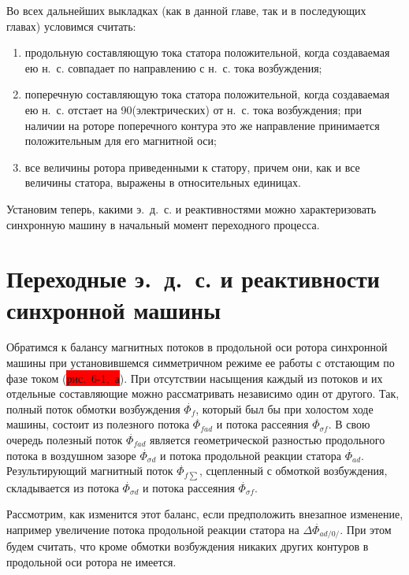 Во всех дальнейших выкладках (как в данной главе, так и в последующих главах) условимся считать:

\begin{enumerate} 
	\item
	продольную составляющую тока статора положительной, когда создаваемая ею н.~с. совпадает по направлению с н.~с. тока возбуждения;
	\item
	поперечную составляющую тока статора положительной, когда создаваемая ею н.~с. отстает на 90\textdegree (электрических) от н.~с. тока возбуждения; при наличии на роторе поперечного контура это же направление принимается положительным для его магнитной оси;
	\item
	все величины ротора приведенными к статору, причем они, как и все величины статора, выражены в относительных единицах.
\end{enumerate}

Установим теперь, какими э.~д.~с. и реактивностями можно характеризовать синхронную машину в начальный момент переходного процесса.

\section{Переходные э.~д.~с. и реактивности синхронной машины}
\label{sec:6-2}

Обратимся к балансу магнитных потоков в продольной оси ротора синхронной машины при установившемся симметричном режиме ее работы с отстающим по фазе током (\colorbox{red}{рис.~6-1,~а}). При отсутствии насыщения каждый из потоков и их отдельные составляющие можно рассматривать независимо один от другого. Так, полный поток обмотки возбуждения $ \overset{\;.}{\Phi}_f $, который был бы при холостом ходе машины, состоит из полезного потока $ \overset{\;.}{\Phi}_{fad} $ и потока рассеяния $ \overset{\;.}{\Phi}_{\sigma f} $. В свою очередь полезный поток $ \overset{\;.}{\Phi}_{fad} $ является геометрической разностью продольного потока в воздушном зазоре $ \overset{\;.}{\Phi}_{\sigma d} $ и потока продольной реакции статора $ \overset{\;.}{\Phi}_{ad} $. Результирующий магнитный поток $ \overset{\;.}{\Phi}_{f\sum} $, сцепленный с обмоткой возбуждения, складывается из потока $ \overset{\;.}{\Phi}_{\sigma d} $ и потока рассеяния $ \overset{\;.}{\Phi}_{\sigma f} $.

Рассмотрим, как изменится этот баланс, если предположить внезапное изменение, например увеличение потока продольной реакции статора на $ \Delta \overset{\;.}{\Phi}_{ad/0/} $. При этом будем считать, что кроме обмотки возбуждения никаких других контуров в продольной оси ротора не имеется.

